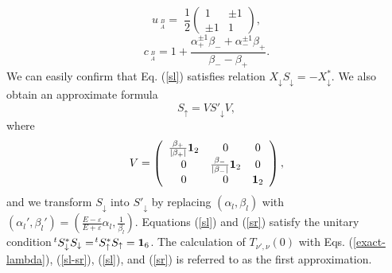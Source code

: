\documentclass{jpsj3}
\begin{document}
\begin{equation}
u_{\;_A^B}
= 
\; \frac{1}{2} \left(
\begin{array}{cc}
1 & \pm 1
\\
\pm 1 & 1
\end{array}
\right),
\end{equation}
\begin{equation}
c_{\;_A^B}=
1+\frac{\alpha_+^{\pm 1} \beta_-+\alpha_-^{\pm 1} \beta_+}{\beta_--\beta_+}.
\end{equation}
We can easily confirm
that Eq. (\ref{sl}) satisfies relation $X_\downarrow S_\downarrow=
-X_\downarrow^*$. 
We also obtain an approximate formula 
\begin{equation}
S_\uparrow= V S'_\downarrow V,
\label{sr} 
\end{equation}
where
\begin{equation}
V
= \left(
\begin{array}{ccc}
\frac{\beta_+}{|\beta_+|}{\bf 1}_2 & 0 & 0
\\
0 & \frac{\beta_-}{|\beta_-|}{\bf 1}_2 & 0
\\
0 & 0 & {\bf 1}_2
\end{array}
\right),
\end{equation}
and we transform $S_\downarrow$ into $S'_\downarrow$
by replacing $(\alpha_l,\beta_l)$
with $(\alpha_l',\beta_l')=\left(\frac{E-\varepsilon}{E+\varepsilon}\alpha_l, \frac{1}{\beta_l}\right)$. 
Equations (\ref{sl}) and (\ref{sr}) satisfy
 the unitary condition $\!^tS_\downarrow^*S_\downarrow=\!^tS_\uparrow^*S_\uparrow=
{\bf 1}_6$.
The calculation of $T_{\nu',\nu}(0)$ with Eqs. (\ref{exact-lambda}),
(\ref{sl-sr}), (\ref{sl}), and (\ref{sr}) is referred to as the first approximation.
\end{document}

